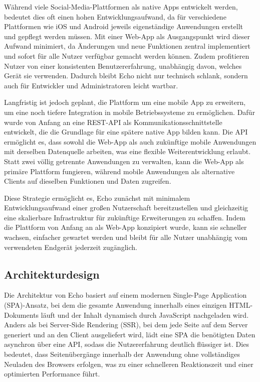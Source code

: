 \documentclass[a4paper,12pt]{article}
\begin{document}
Während viele Social-Media-Plattformen als native Apps entwickelt werden,
bedeutet dies oft einen hohen Entwicklungsaufwand, da für verschiedene
Plattformen wie iOS und Android jeweils eigenständige Anwendungen erstellt und
gepflegt werden müssen. Mit einer Web-App als Ausgangspunkt wird dieser Aufwand
minimiert, da Änderungen und neue Funktionen zentral implementiert und sofort
für alle Nutzer verfügbar gemacht werden können. Zudem profitieren Nutzer von
einer konsistenten Benutzererfahrung, unabhängig davon, welches Gerät sie
verwenden. Dadurch bleibt Echo nicht nur technisch schlank, sondern auch für
Entwickler und Administratoren leicht wartbar.

Langfristig ist jedoch geplant, die Plattform um eine mobile App zu erweitern,
um eine noch tiefere Integration in mobile Betriebssysteme zu ermöglichen.
Dafür wurde von Anfang an eine REST-API als Kommunikationsschnittstelle
entwickelt, die die Grundlage für eine spätere native App bilden kann. Die API
ermöglicht es, dass sowohl die Web-App als auch zukünftige mobile Anwendungen
mit derselben Datenquelle arbeiten, was eine flexible Weiterentwicklung
erlaubt. Statt zwei völlig getrennte Anwendungen zu verwalten, kann die Web-App
als primäre Plattform fungieren, während mobile Anwendungen als alternative
Clients auf dieselben Funktionen und Daten zugreifen.

Diese Strategie ermöglicht es, Echo zunächst mit minimalem Entwicklungsaufwand
einer großen Nutzerschaft bereitzustellen und gleichzeitig eine skalierbare
Infrastruktur für zukünftige Erweiterungen zu schaffen. Indem die Plattform von
Anfang an als Web-App konzipiert wurde, kann sie schneller wachsen, einfacher
gewartet werden und bleibt für alle Nutzer unabhängig vom verwendeten Endgerät
jederzeit zugänglich.

\subsection{Architekturdesign}
Die Architektur von Echo basiert auf einem modernen Single-Page Application
(SPA)-Ansatz, bei dem die gesamte Anwendung innerhalb eines einzigen
HTML-Dokuments läuft und der Inhalt dynamisch durch JavaScript nachgeladen
wird. Anders als bei Server-Side Rendering (SSR), bei dem jede Seite auf dem
Server generiert und an den Client ausgeliefert wird, lädt eine SPA die
benötigten Daten asynchron über eine API, sodass die Nutzererfahrung deutlich
flüssiger ist. Dies bedeutet, dass Seitenübergänge innerhalb der Anwendung ohne
vollständiges Neuladen des Browsers erfolgen, was zu einer schnelleren
Reaktionszeit und einer optimierten Performance führt.
\end{document}
